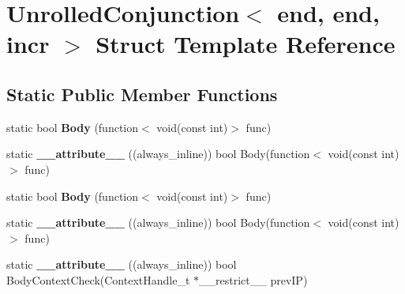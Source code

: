 \hypertarget{structUnrolledConjunction_3_01end_00_01end_00_01incr_01_4}{\section{Unrolled\-Conjunction$<$ end, end, incr $>$ Struct Template Reference}
\label{structUnrolledConjunction_3_01end_00_01end_00_01incr_01_4}
}
\subsection*{Static Public Member Functions}
\begin{DoxyCompactItemize}
\item 
\hypertarget{structUnrolledConjunction_3_01end_00_01end_00_01incr_01_4_a4b0f5eda7be4c5258da2c82cc734b88f}{static bool {\bfseries Body} (function$<$ void(const int)$>$ func)}\label{structUnrolledConjunction_3_01end_00_01end_00_01incr_01_4_a4b0f5eda7be4c5258da2c82cc734b88f}

\item 
\hypertarget{structUnrolledConjunction_3_01end_00_01end_00_01incr_01_4_adce5a34e74f011f45f5de2c5fb0087dc}{static {\bfseries \-\_\-\-\_\-attribute\-\_\-\-\_\-} ((always\-\_\-inline)) bool Body(function$<$ void(const int)$>$ func)}\label{structUnrolledConjunction_3_01end_00_01end_00_01incr_01_4_adce5a34e74f011f45f5de2c5fb0087dc}

\item 
\hypertarget{structUnrolledConjunction_3_01end_00_01end_00_01incr_01_4_a4b0f5eda7be4c5258da2c82cc734b88f}{static bool {\bfseries Body} (function$<$ void(const int)$>$ func)}\label{structUnrolledConjunction_3_01end_00_01end_00_01incr_01_4_a4b0f5eda7be4c5258da2c82cc734b88f}

\item 
\hypertarget{structUnrolledConjunction_3_01end_00_01end_00_01incr_01_4_adce5a34e74f011f45f5de2c5fb0087dc}{static {\bfseries \-\_\-\-\_\-attribute\-\_\-\-\_\-} ((always\-\_\-inline)) bool Body(function$<$ void(const int)$>$ func)}\label{structUnrolledConjunction_3_01end_00_01end_00_01incr_01_4_adce5a34e74f011f45f5de2c5fb0087dc}

\item 
\hypertarget{structUnrolledConjunction_3_01end_00_01end_00_01incr_01_4_a2ec2f1e021e2ac05cd6790b3787df39b}{static {\bfseries \-\_\-\-\_\-attribute\-\_\-\-\_\-} ((always\-\_\-inline)) bool Body\-Context\-Check(Context\-Handle\-\_\-t $\ast$\-\_\-\-\_\-restrict\-\_\-\-\_\- prev\-I\-P)}\label{structUnrolledConjunction_3_01end_00_01end_00_01incr_01_4_a2ec2f1e021e2ac05cd6790b3787df39b}


\end{DoxyCompactItemize}
